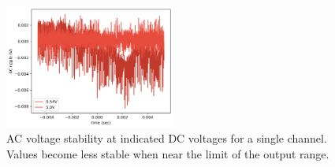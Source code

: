 \documentclass[10pt,a4paper]{article}
\begin{document}
\begin{figure}
	\centering
	\includegraphics[width=0.5\textwidth]{../output/acRippleChan8.png}
	\caption[stabilityOverRange]{AC voltage stability at indicated DC voltages for a single channel.  Values become less stable when near the limit of the output range.\newline}
	\label{fig:stabilityAcrossRange}
\end{figure} 
\end{document}
